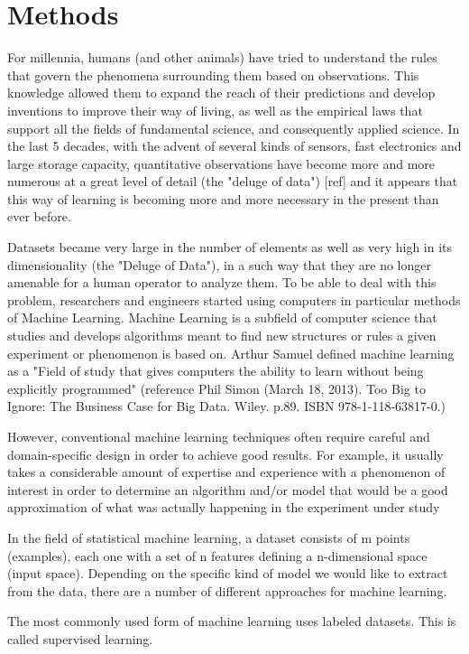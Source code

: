 \documentclass{article}
\begin{document}
\section{Methods}
For millennia, humans (and other animals) have tried to understand the rules that govern the phenomena surrounding them based on observations. This knowledge allowed them to expand the reach of their predictions and develop inventions to improve their way of living, as well as the empirical laws that support all the fields of fundamental science, and consequently applied science. In the last 5 decades, with the advent of several kinds of sensors, fast electronics and large storage capacity, quantitative observations have become more and more numerous at a great level of detail (the "deluge of data") [ref] and it appears that this way of learning is becoming more and more necessary in the present than ever before.

Datasets became very large in the number of elements as well as very high in its dimensionality (the "Deluge of Data"), in a such way that they are no longer amenable for a human operator to analyze them. To be able to deal with this problem, researchers and engineers started using computers in particular methods of Machine Learning. Machine Learning is a subfield of computer science that studies and develops algorithms meant to find new structures or rules a given experiment or phenomenon is based on. Arthur Samuel defined machine learning as a "Field of study that gives computers the ability to learn without being explicitly programmed" (reference Phil Simon (March 18, 2013). Too Big to Ignore: The Business Case for Big Data. Wiley. p.89. ISBN 978-1-118-63817-0.)

However, conventional machine learning techniques often require careful and domain-specific design in order to achieve good results. For example, it usually takes a considerable amount of expertise and experience with a phenomenon of interest in order to determine an algorithm and/or model that would be a good approximation of what was actually happening in the experiment under study

In the field of statistical machine learning, a dataset consists of m points (examples), each one with a set of n features defining a n-dimensional space (input space). Depending on the specific kind of model we would like to extract from the data, there are a number of different approaches for machine learning.

The most commonly used form of machine learning uses labeled datasets. This is called supervised learning.
\end{document}
